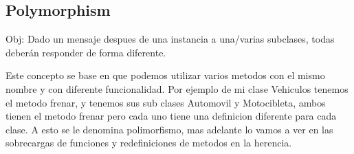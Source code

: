 \subsection{Polymorphism}

Obj: Dado un mensaje despues de una instancia a una/varias subclases, todas deberán responder de forma diferente.

Este concepto se base en que podemos utilizar varios metodos con el mismo nombre y con diferente funcionalidad. Por ejemplo de mi clase Vehiculos tenemos el metodo frenar, y tenemos sus sub clases Automovil y Motocibleta, ambos tienen el metodo frenar pero cada uno tiene una definicion diferente para cada clase. A esto se le denomina polimorfismo, mas adelante lo vamos a ver en las sobrecargas de funciones y redefiniciones de metodos en la herencia.
